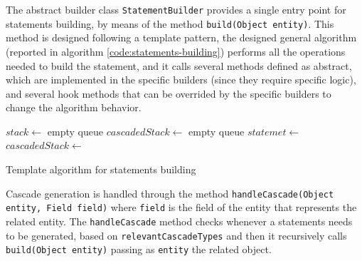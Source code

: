 \newparagraph The abstract builder class \texttt{StatementBuilder} provides a single entry point for statements building, by means of the method \texttt{build(Object entity)}. This method is designed following a template pattern, the designed general algorithm (reported in algorithm \ref{code:statements-building}) performs all the operations needed to build the statement, and it calls several methods defined as abstract, which are implemented in the specific builders (since they require specific logic), and several hook methods that can be overrided by the specific builders to change the algorithm behavior.

\begin{algorithm}[h]
  \scriptsize
  \begin{algorithmic}[1]
    \State $stack \gets$ empty queue
    \State $cascadedStack \gets$ empty queue
	\State $statemet \gets$ 
    \State {}
          \State $cascadedStack \gets$ 
        \EndIf
          \State {}
        \Else
        	  \State {}
        	\EndIf
      \Else
          \State {}
        	\EndIf
      \EndIf
          \State {}
        \Else
          \State {}
        \EndIf
    \EndFor        
    \State {}
      \State {}
    \EndIf
  \EndFunction
  \end{algorithmic}
  \caption{Template algorithm for statements building}
  \label{code:statements-building}
\end{algorithm}

\noindent Cascade generation is handled through the method \texttt{handleCascade(Object entity, Field field)} where \texttt{field} is the field of the entity that represents the related entity. The \texttt{handleCascade} method checks whenever a statements needs to be generated, based on \texttt{relevantCascadeTypes} and then it recursively calls \texttt{build(Object entity)} passing as \texttt{entity} the related object. 

